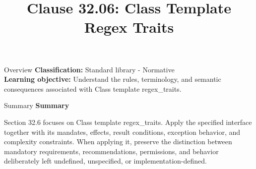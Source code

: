 \documentclass[10pt,letterpaper]{article}
\title{Clause 32.06: Class Template Regex Traits}
\author{}
\date{}
\begin{document}
\maketitle
\begin{CornellOverviewBox}{Overview}
\textbf{Classification:} Standard library - Normative\\[2pt]
\textbf{Learning objective:} Understand the rules, terminology, and semantic consequences associated with Class template regex\_traits.
\end{CornellOverviewBox}\begin{CornellSummaryBox}{Summary}
{\sffamily\bfseries\color{Accent} Summary}\par\vspace{3pt}Section 32.6 focuses on Class template regex\_traits. Apply the specified interface together with its mandates, effects, result conditions, exception behavior, and complexity constraints. When applying it, preserve the distinction between mandatory requirements, recommendations, permissions, and behavior deliberately left undefined, unspecified, or implementation-defined.
\end{CornellSummaryBox}
\end{document}
